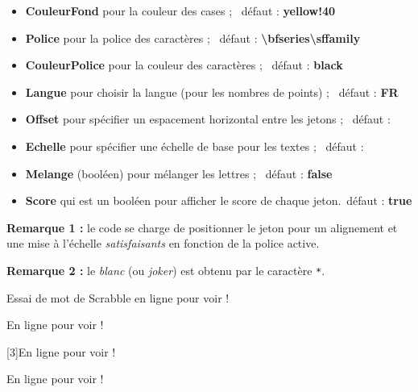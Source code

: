 \documentclass{article}
\newcommand\Cle[1]{{\bfseries\sffamily\textlangle #1\textrangle}}
\begin{document}
\begin{itemize}
	\item \Cle{CouleurFond} pour la couleur des cases ; \hfill~défaut : \Cle{yellow!40}
	\item \Cle{Police} pour la police des caractères ; \hfill~défaut : \Cle{\textbackslash bfseries\textbackslash sffamily}
	\item \Cle{CouleurPolice} pour la couleur des caractères ; \hfill~défaut : \Cle{black}
	\item \Cle{Langue} pour choisir la langue (pour les nombres de points) ; \hfill~défaut : \Cle{FR}
	\item \Cle{Offset} pour spécifier un espacement horizontal entre les jetons ; \hfill~défaut : \Cle{0.1pt}
	\item \Cle{Echelle} pour spécifier une échelle de base pour les textes ; \hfill~défaut : \Cle{0.6}
	\item \Cle{Melange} (booléen) pour mélanger les lettres ; \hfill~défaut : \Cle{false}
	\item \Cle{Score} qui est un booléen pour afficher le score de chaque jeton.\hfill~défaut : \Cle{true}
\end{itemize}

\textbf{Remarque 1 :} le code se charge de positionner le jeton pour un alignement et une mise à l'échelle \textit{satisfaisants} en fonction de la police active.

\smallskip

\textbf{Remarque 2 :} le \textit{blanc} (ou \textit{joker}) est obtenu par le caractère \texttt{*}.

\begin{PresentationCode}{}
Essai de mot de Scrabble en ligne  pour voir !
\end{PresentationCode}

\begin{PresentationCode}{}
{\Huge\sffamily En ligne  pour voir !}
\end{PresentationCode}

\begin{PresentationCode}{}
\scalebox{3}[3]{En ligne  pour voir !}
\end{PresentationCode}

\begin{PresentationCode}{}
{\LARGE En ligne  pour voir !}
\end{PresentationCode}
\end{document}
